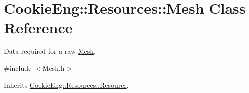 \hypertarget{struct_cookie_eng_1_1_resources_1_1_mesh}{}\section{Cookie\+Eng\+:\+:Resources\+:\+:Mesh Class Reference}
\label{struct_cookie_eng_1_1_resources_1_1_mesh}


Data required for a raw \hyperlink{struct_cookie_eng_1_1_resources_1_1_mesh}{Mesh}.  




{\ttfamily \#include $<$Mesh.\+h$>$}



Inherits \hyperlink{class_cookie_eng_1_1_resources_1_1_resource}{Cookie\+Eng\+::\+Resources\+::\+Resource}.

